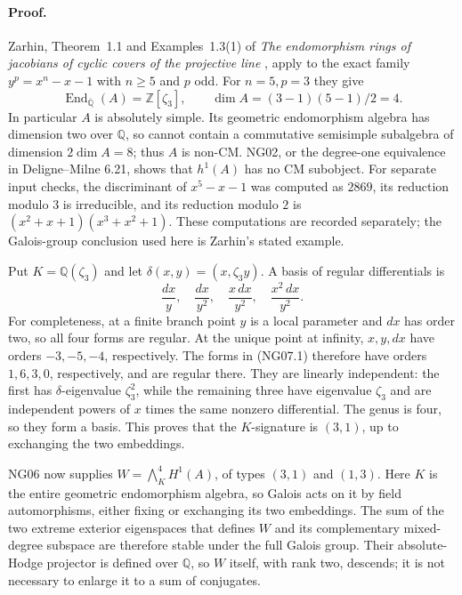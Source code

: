 \documentclass[11pt]{article}
\theoremstyle{remark}
\begin{document}
\paragraph{Proof.}
Zarhin, Theorem~1.1 and Examples~1.3(1) of
\emph{The endomorphism rings of jacobians of cyclic covers of the
projective line} \cite{NGZarhin}, apply to the exact family
$y^p=x^n-x-1$ with $n\ge5$ and $p$ odd.  For $n=5,p=3$ they give
\[
 \operatorname{End}_{\overline{\mathbb Q}}(A)=\mathbb Z[\zeta_3],
 \qquad \dim A=(3-1)(5-1)/2=4.
\]
In particular $A$ is absolutely simple.  Its geometric endomorphism
algebra has dimension two over $\mathbb Q$, so cannot contain a
commutative semisimple subalgebra of dimension $2\dim A=8$; thus
$A$ is non-CM.  NG02, or the degree-one equivalence in
Deligne--Milne 6.21, shows that $h^1(A)$ has no CM subobject.
For separate input checks, the discriminant of $x^5-x-1$ was computed as
$2869$, its reduction modulo $3$ is irreducible, and its reduction
modulo $2$ is
$(x^2+x+1)(x^3+x^2+1)$.  These computations are recorded separately;
the Galois-group conclusion used here is Zarhin's stated example.

Put $K=\mathbb Q(\zeta_3)$ and let
$\delta(x,y)=(x,\zeta_3y)$.  A basis of regular differentials is
\[
 \frac{dx}{y},\quad \frac{dx}{y^2},\quad
                    \frac{x\,dx}{y^2},\quad
                    \frac{x^2\,dx}{y^2}.                    \tag{NG07.1}
\]
For completeness, at a finite branch point $y$ is a local parameter
and $dx$ has order two, so all four forms are regular.  At the unique
point at infinity, $x,y,dx$ have orders $-3,-5,-4$, respectively.
The forms in (NG07.1) therefore have orders $1,6,3,0$, respectively,
and are regular there.  They are linearly independent: the first has
$\delta$-eigenvalue $\zeta_3^2$, while the remaining three have
eigenvalue $\zeta_3$ and are independent powers of $x$ times the same
nonzero differential.  The genus is four, so they form a basis.
This proves that the $K$-signature is $(3,1)$, up to exchanging the
two embeddings.

NG06 now supplies
$W=\bigwedge_K^4 H^1(A)$, of types $(3,1)$ and $(1,3)$.
Here $K$ is the entire geometric endomorphism algebra, so Galois acts
on it by field automorphisms, either fixing or exchanging its two
embeddings.  The sum of the two extreme exterior eigenspaces that
defines $W$ and its complementary mixed-degree subspace are
therefore stable under the full Galois group.  Their absolute-Hodge
projector is defined over $\mathbb Q$, so $W$ itself, with rank two,
descends; it is not necessary to enlarge it to a sum of conjugates.
\end{document}
